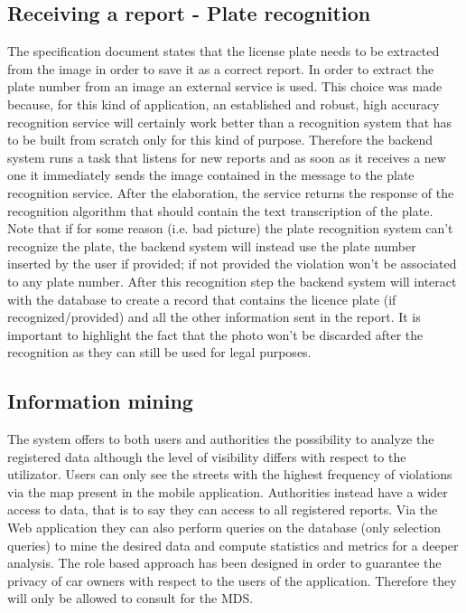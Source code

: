 \subsection{Receiving a report - Plate recognition}
The specification document states that the license plate needs to be extracted from the image in order to save it as a correct report. In order to extract the plate number from an image an external service is used. This choice was made because, for this kind of application, an established and robust, high accuracy recognition service will certainly work better than a recognition system that has to be built from scratch only for this kind of purpose. Therefore the backend system runs a task that listens for new reports and as soon as it receives a new one it immediately sends the image contained in the message to the plate recognition service. After the elaboration, the service returns the response of the recognition algorithm that should contain the text transcription of the plate. Note that if for some reason (i.e. bad picture) the plate recognition system can't recognize the plate, the backend system will instead use the plate number inserted by the user if provided; if not provided the violation won't be associated to any plate number. After this recognition step the backend system will interact with the database to create a record that contains the licence plate (if recognized/provided) and all the other information sent in the report. It is important to highlight the fact that the photo won't be discarded after the recognition as they can still be used for legal purposes.

\subsection{Information mining}
The system offers to both users and authorities the possibility to analyze the registered data although the level of visibility differs with respect to the utilizator. 
Users can only see the streets with the highest frequency of violations via the map present in the mobile application. Authorities instead have a wider access to data, that is to say they can access to all registered reports. Via the Web application they can also perform queries on the database (only selection queries) to mine the desired data and compute statistics and metrics for a deeper analysis. The role based approach has been designed in order to guarantee the privacy of car owners with respect to the users of the application. Therefore they will only be allowed to consult for the MDS.

